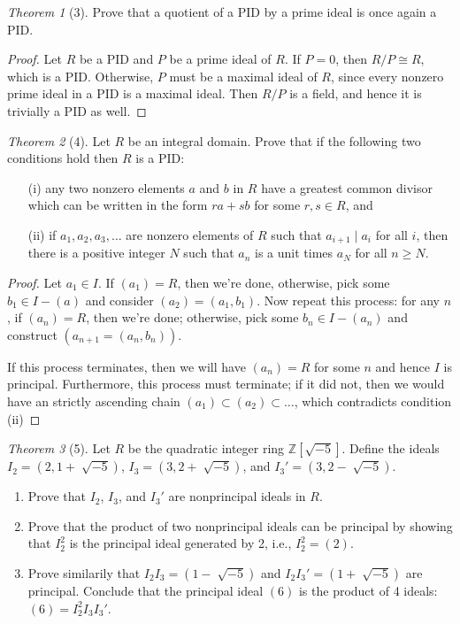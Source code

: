 \documentclass[12pt]{article}
\theoremstyle{remark}
\theoremstyle{named}
\newtheorem*{theorem}{Theorem}
\newcommand{\Z}{\mathbb Z}
\begin{document}
\begin{theorem}[3]
    Prove that a quotient of a PID by a prime ideal is once again a PID.
\end{theorem}

\begin{proof}
    Let \(R\) be a PID and \(P\) be a prime ideal of \(R\). If \(P = 0\), then \(R / P \cong R\), which is a PID. Otherwise, \(P\) must be a maximal ideal of \(R\), since every nonzero prime ideal in a PID is a maximal ideal. Then \(R / P\) is a field, and hence it is trivially a PID as well.
\end{proof}

\begin{theorem}[4]
    Let \(R\) be an integral domain. Prove that if the following two conditions hold then \(R\) is a PID:
    \begin{enumerate}
        \item [(i)] any two nonzero elements \(a\) and \(b\) in \(R\) have a greatest common divisor which can be written in the form \(ra + sb\) for some \(r, s \in R\), and
        \item [(ii)] if \(a_1, a_2, a_3, \dots\) are nonzero elements of \(R\) such that \(a_{i + 1} \mid a_i\) for all \(i\), then there is a positive integer \(N\) such that \(a_n\) is a unit times \(a_N\) for all \(n \ge N\). 
    \end{enumerate}
\end{theorem}

\begin{proof}
    Let \(a_1 \in I\). If \((a_1) = R\), then we're done, otherwise, pick some \(b_1 \in I - (a)\) and consider \((a_2) = (a_1, b_1)\). Now repeat this process: for any \(n\), if \((a_n) = R\), then we're done; otherwise, pick some \(b_n \in I - (a_n)\) and construct \((a_{n + 1} = (a_n, b_n))\).

    If this process terminates, then we will have \((a_n) = R\) for some \(n\) and hence \(I\) is principal. Furthermore, this process must terminate; if it did not, then we would have an strictly ascending chain \((a_1) \subset (a_2) \subset \dots\), which contradicts condition (ii)
\end{proof}

\begin{theorem}[5]
    Let \(R\) be the quadratic integer ring \(\Z[\sqrt{-5}]\). Define the ideals \(I_2 = (2, 1 + \sqrt[]{-5})\), \(I_3 = (3, 2 + \sqrt[]{-5})\), and \(I_3' = (3, 2 - \sqrt[]{-5})\).
    \begin{enumerate}
        \item Prove that \(I_2\), \(I_3\), and \(I_3'\) are nonprincipal ideals in \(R\).
        \item Prove that the product of two nonprincipal ideals can be principal by showing that \(I_2^2\) is the principal ideal generated by 2, i.e., \(I_2^2 = (2)\).
        \item Prove similarily that \(I_2 I_3 = (1 - \sqrt[]{-5})\) and \(I_2 I_3' = (1 + \sqrt[]{-5})\) are principal. Conclude that the principal ideal \((6)\) is the product of 4 ideals: \((6) = I_2^2 I_3 I_3'\).
    \end{enumerate}
\end{theorem}
\end{document}
